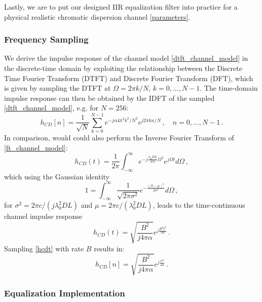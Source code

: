 \documentclass[paper=a4, fontsize=11pt]{scrartcl} %
\numberwithin{equation}{section} %
\numberwithin{figure}{section} %
\numberwithin{table}{section} %
\begin{document}
Lastly, we are to put our designed IIR equalization filter into practice for a physical realistic chromatic dispersion channel \eqref{parameters}.

\subsubsection{Frequency Sampling}

We derive the impulse response of the channel model \eqref{dtft_channel_model} in the discrete-time domain by exploiting the relationship between the Discrete Time Fourier Transform (DTFT) and Discrete Fourier Transform (DFT), which is given by sampling the DTFT at $\Omega=2\pi k/N$, $k=0,...,N-1$. The time-domain impulse response can then be obtained by the IDFT of the sampled \eqref{dtft_channel_model}, e.g. for $N=256$:
\begin{equation} 
h_{CD}[n]=\frac{1}{\sqrt{N}}\sum_{k=0}^{N-1}e^{-j\alpha4\pi^2k^2/N^2}e^{j2\pi kn/N}\, , \quad n = 0,...,N-1\label{idft_ir}\, .
\end{equation}
In comparison, would could also perform the Inverse Fourier Transform of \eqref{ft_channel_model}:
\begin{equation} 
h_{CD}(t)=\frac{1}{2\pi}\int_{-\infty}^{\infty}e^{-j\frac{\lambda_0DL}{4\pi c}\Omega^2}e^{j\Omega t}d\Omega\label{IFT}\, ,
\end{equation}
which using the Gaussian identity
\begin{equation} 
1=\int_{-\infty}^{\infty}\frac{1}{\sqrt{2\pi\sigma^2}}e^{-\frac{(\Omega-\mu)^2}{2\sigma^2}}d\Omega\label{IFT}\, ,
\end{equation}
for $\sigma^2=2\pi c/(j\lambda_0^2DL)$ and $\mu=2\pi c/(\lambda_0^2DL)$, leads to the time-continuous channel impulse response
\begin{equation} 
h_{CD}(t)=\sqrt{\frac{B^2}{j4\pi \alpha}}e^{j\frac{B^2t^2}{4\alpha}}\label{hcdt}\, .
\end{equation}
Sampling \eqref{hcdt} with rate $B$ results in:
\begin{equation} 
h_{CD}[n]=\sqrt{\frac{B^2}{j4\pi \alpha}}e^{j\frac{n^2}{4\alpha}}\label{hcdn}\, .
\end{equation}

\subsubsection{Equalization Implementation}
\end{document}
